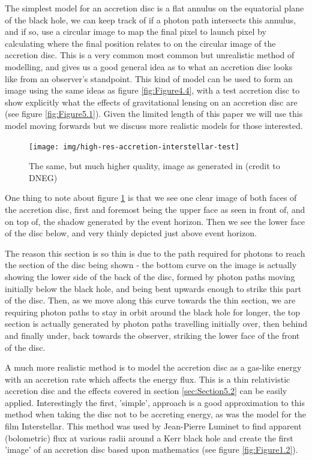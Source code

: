 \documentclass[oneside,openright,frontopenright, singlespacing]{dmathesis}
\begin{document}
\vspace{1em}
	The simplest model for an accretion disc is a flat annulus on the equatorial plane of the black hole, we can keep track of if a photon path intersects this annulus, and if so, use a circular image to map the final pixel to launch pixel by calculating where the final position relates to on the circular image of the accretion disc. This is a very common most common but unrealistic method of modelling, and gives us a good general idea as to what an accretion disc looks like from an observer's standpoint. This kind of model can be used to form an image using the same ideas as figure \ref{fig:Figure4.4}, with a test accretion disc to show explicitly what the effects of gravitational lensing on an accretion disc are (see figure \ref{fig:Figure5.1}). Given the limited length of this paper we will use this model moving forwards but we discuss more realistic models for those interested.

\begin{figure}[!ht]
	\centering
	\texttt{[image: img/high-res-accretion-interstellar-test]}
	\caption{The same, but much higher quality, image as generated in \cite{thorne2015gravitational} (credit to DNEG)}
	\label{fig:Figure5.2}
\end{figure}

\vspace{1em}
	One thing to note about figure \ref{fig:Figure5.2} is that we see one clear image of both faces of the accretion disc, first and foremost being the upper face as seen in front of, and on top of, the shadow generated by the event horizon. Then we see the lower face of the disc below, and very thinly depicted just above event horizon. 

\vspace{1em}
	The reason this section is so thin is due to the path required for photons to reach the section of the disc being shown - the bottom curve on the image is actually showing the lower side of the back of the disc, formed by photon paths moving initially below the black hole, and being bent upwards enough to strike this part of the disc. Then, as we move along this curve towards the thin section, we are requiring photon paths to stay in orbit around the black hole for longer, the top section is actually generated by photon paths travelling initially over, then behind and finally under, back towards the observer, striking the lower face of the front of the disc.

\vspace{1em}
	A much more realistic method is to model the accretion disc as a gas-like energy with an accretion rate which affects the energy flux. This is a thin relativistic accretion disc and the effects covered in section \ref{sec:Section5.2} can be easily applied. Interestingly the first, 'simple', approach is a good approximation to this method when taking the disc not to be accreting energy, as was the model for the film Interstellar. This method was used by Jean-Pierre Luminet to find apparent (bolometric) flux at various radii around a Kerr black hole and create the first 'image' of an accretion disc based upon mathematics\cite{luminet1979image} (see figure \ref{fig:Figure1.2}).
\end{document}
